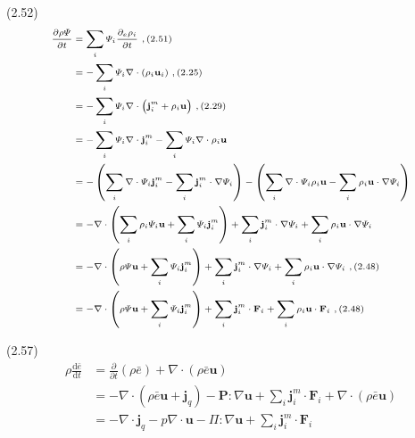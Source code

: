 \documentclass[10pt,aspectratio=43,mathserif,table]{ctexbeamer}
\begin{document}
\begin{frame}
    (2.52)
    $$\scriptsize
    \begin{aligned}
        \frac{\partial \rho \varPsi}{\partial t}&=\sum_i{\varPsi _i\frac{\partial _e\rho _i}{\partial t}\,\, , \left( 2.51 \right)}\\
        &=-\sum_i{\varPsi _i\nabla \cdot \left( \rho _i\mathbf{u}_i \right)}\,\, , \left( 2.25 \right)\\
        &=-\sum_i{\varPsi _i\nabla \cdot \left( \mathbf{j}_{i}^{m}+\rho _i\mathbf{u} \right)}\,\, , \left( 2.29 \right)\\
        &=-\sum_i{\varPsi _i\nabla \cdot \mathbf{j}_{i}^{m}}-\sum_i{\varPsi _i\nabla \cdot \rho _i\mathbf{u}}\\
        &=-\left( \sum_i{\nabla \cdot \varPsi _i\mathbf{j}_{i}^{m}}-\sum_i{\mathbf{j}_{i}^{m}\cdot \nabla \varPsi _i} \right) -\left( \sum_i{\nabla \cdot \varPsi _i\rho _i\mathbf{u}}-\sum_i{\rho _i\mathbf{u}\cdot \nabla \varPsi _i} \right)\\
        &=-\nabla \cdot \left( \sum_i{\rho _i\varPsi _i\mathbf{u}}+\sum_i{\varPsi _i\mathbf{j}_{i}^{m}} \right) +\sum_i{\mathbf{j}_{i}^{m}\cdot \nabla \varPsi _i}+\sum_i{\rho _i\mathbf{u}\cdot \nabla \varPsi _i}\\
        &=-\nabla \cdot \left( \rho \varPsi \mathbf{u}+\sum_i{\varPsi _i\mathbf{j}_{i}^{m}} \right) +\sum_i{\mathbf{j}_{i}^{m}\cdot \nabla \varPsi _i}+\sum_i{\rho _i\mathbf{u}\cdot \nabla \varPsi _i}\,\, , \left( 2.48 \right)\\
        &=-\nabla \cdot \left( \rho \varPsi \mathbf{u}+\sum_i{\varPsi _i\mathbf{j}_{i}^{m}} \right) +\sum_i{\mathbf{j}_{i}^{m}\cdot \mathbf{F}_i}+\sum_i{\rho _i\mathbf{u}\cdot \mathbf{F}_i}\,\, , \left( 2.48 \right)\\
    \end{aligned}
    $$

\end{frame}

\begin{frame}
    (2.57)
    $$
    \begin{aligned}
        \rho \frac{\mathrm{d}\bar{e}}{\mathrm{d}t}&=\frac{\partial}{\partial t}\left( \rho \bar{e} \right) +\nabla \cdot \left( \rho \bar{e}\mathbf{u} \right)\\
        &=-\nabla \cdot \left( \rho \bar{e}\mathbf{u}+\mathbf{j}_q \right) -\mathbf{P}:\nabla \mathbf{u}+\sum_i{\mathbf{j}_{i}^{m}\cdot \mathbf{F}_i}+\nabla \cdot \left( \rho \bar{e}\mathbf{u} \right)\\
        &=-\nabla \cdot \mathbf{j}_q-p\nabla \cdot \mathbf{u}-\Pi :\nabla \mathbf{u}+\sum_i{\mathbf{j}_{i}^{m}\cdot \mathbf{F}_i}\\
    \end{aligned}
    $$
\end{frame}
\end{document}
